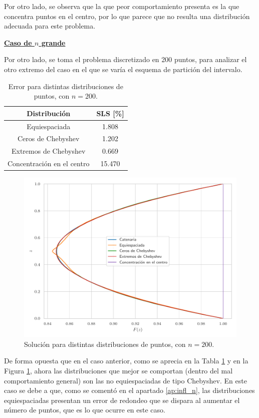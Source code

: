 Por otro lado, se observa que la que peor comportamiento presenta es la que concentra puntos en el centro, por lo que parece que no resulta una distribución adecuada para este problema.


\underline{\textbf{Caso de $n$ grande}}

Por otro lado, se toma el problema discretizado en 200 puntos, para analizar el otro extremo del caso en el que se varía el esquema de partición del intervalo.

\begin{table}[h]
    \centering
    \caption{Error para distintas distribuciones de puntos, con $n = 200$.}
    \begin{tabular}{c c}
        \hline
        \textbf{Distribución} & \textbf{SLS [\%]} \\ \hline \hline
        Equiespaciada              & 1.808 \\ \hline
        Ceros de Chebyshev         & 1.202 \\ \hline
        Extremos de Chebyshev      & 0.669 \\ \hline 
        Concentración en el centro & 15.470 \\ \hline
    \end{tabular}
    \label{tab:erorr_distrib_n200}
\end{table}

\begin{figure}[h]
    \centering
    \includegraphics[width = 0.6 \linewidth]{Figures/01/sol_distrib_n200.pdf}
    \caption{Solución para distintas distribuciones de puntos, con $n = 200$.}
    \label{fig:sol_distrib_n200}
\end{figure}

De forma opuesta que en el caso anterior, como se aprecia en la Tabla \ref{tab:erorr_distrib_n200} y en la Figura \ref{fig:sol_distrib_n200}, ahora las distribuciones que mejor se comportan (dentro del mal comportamiento general) son las no equiespaciadas de tipo Chebyshev. En este caso se debe a que, como se comentó en el apartado \ref{ap:infl_n}, las distribuciones equiespaciadas presentan un error de redondeo que se dispara al aumentar el número de puntos, que es lo que ocurre en este caso. 

